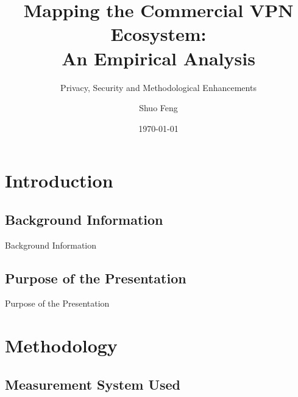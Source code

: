 \documentclass{beamer}
\title[Mapping the Commercial VPN Ecosystem]{
    Mapping the Commercial VPN Ecosystem:\\
    An Empirical Analysis
}
\subtitle[]{Privacy, Security and Methodological Enhancements}
\author[S. Feng]{Shuo Feng}
\institute[NIMS Lab]{NIMS Lab}
\date{\today}
\begin{document}
\frame{\titlepage}



\section{Introduction}

\subsection{Background Information}

\begin{frame}{Background Information}
\end{frame}

\subsection{Purpose of the Presentation}

\begin{frame}{Purpose of the Presentation}
\end{frame}

\section{Methodology}

\subsection{Measurement System Used}
\end{document}

